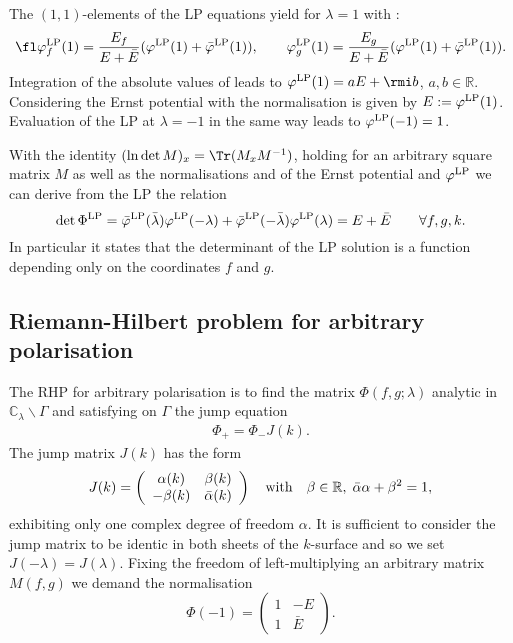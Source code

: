 \documentclass[12pt]{iopart}
\begin{document}
The $(1,1)$-elements of the LP equations  yield for $\lambda=1$ with :
\begin{eqnarray}
\fl\varphi^{\rm LP}_f(1)=\frac{E_f}{E+\bar{E}}(\varphi^{\rm LP}(1)+\bar{\varphi}^{\rm LP}(1)), \quad\quad 
\varphi^{\rm LP}_g(1)=\frac{E_g}{E+\bar{E}}(\varphi^{\rm LP}(1)+\bar{\varphi}^{\rm LP}(1)) \label{ChiF}.
\end{eqnarray}
Integration of the absolute values of  leads to $\varphi^{\rm LP}(1)=aE+\rmi b$,
 $a,b \in\mathbb{R}$. Considering  the Ernst potential with the normalisation  is given by $E:=\varphi^{\rm LP}(1)$. Evaluation of the LP at $\lambda=-1$ in the same way leads to $\varphi^{\rm LP}(-1)=1$.
 
With the identity $(\ln \det M)_x=\Tr(M_x M^{-1})$, holding for an arbitrary square matrix $M$ as well as the normalisations  and  of the Ernst potential and $\varphi^{\rm LP}$ we can derive from the LP the relation
\begin{equation}
\det\Phi^{\rm LP}=\bar{\varphi}^{\rm LP}(\bar{\lambda})\varphi^{\rm LP}(-\lambda)+\bar{\varphi}^{\rm LP}(-\bar{\lambda})\varphi^{\rm LP}(\lambda)=E+\bar{E} \qquad \forall f,g,k. \label{DetPhi}
\end{equation}
In particular it states that the determinant of the LP solution is a function depending only on the coordinates $f$ and $g$.


\subsection{Riemann-Hilbert problem for arbitrary polarisation}

The RHP for arbitrary polarisation is to find the matrix $\Phi(f,g;\lambda)$ analytic in $\mathbb{C}_{\lambda}\backslash\Gamma$ and satisfying on $\Gamma$ the jump equation
\begin{eqnarray}
\Phi_+= \Phi_- J(k). \label{RHPSprung} 
\end{eqnarray}
The jump matrix $J(k)$ has the form
\begin{eqnarray}
J(k)=\left(\begin{array}{cc} \alpha(k) & \beta(k) \\  -\beta(k) & \bar{\alpha}(k) \end{array}\right) \quad\rm{with}\quad \beta \in \mathbb{R},\; \bar{\alpha}\alpha+\beta^2=1,     \label{CForm} 
\end{eqnarray}
exhibiting only one complex degree of freedom $\alpha$. It is sufficient to consider the jump matrix to be identic in both sheets of the $k$-surface and so we set $J(-\lambda)=J(\lambda)$. Fixing the freedom of left-multiplying an arbitrary matrix $M(f,g)$ we demand the normalisation
\begin{equation}
\Phi(-1)=\left(\begin{array}{cc} 1 & -E \\ 1  & \bar{E} \end{array}\right). \label{NormRHP}
\end{equation}
\end{document}
